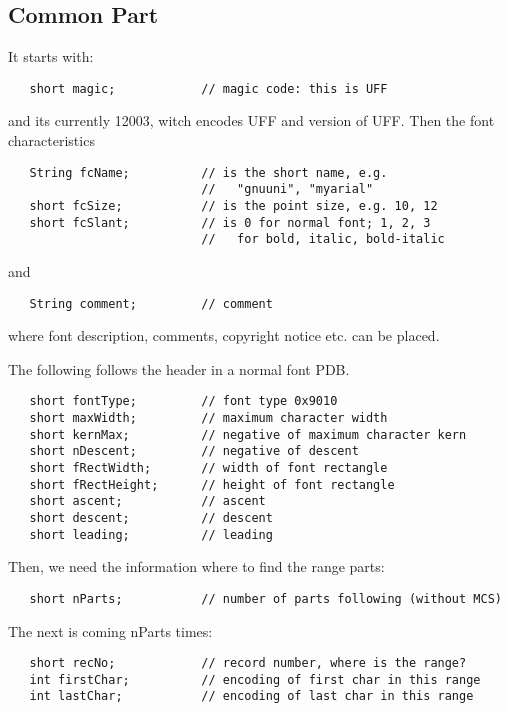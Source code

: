 \documentclass[a4paper]{article}
\begin{document}
\subsection{Common Part}

It starts with:

\begin{verbatim}
   short magic;            // magic code: this is UFF
\end{verbatim}

and its currently 12003, witch encodes UFF and version of UFF. Then
the font characteristics 

\begin{verbatim}
   String fcName;          // is the short name, e.g. 
                           //   "gnuuni", "myarial"
   short fcSize;           // is the point size, e.g. 10, 12
   short fcSlant;          // is 0 for normal font; 1, 2, 3 
                           //   for bold, italic, bold-italic
\end{verbatim}

and

\begin{verbatim}
   String comment;         // comment
\end{verbatim}

where font description, comments, copyright notice etc. can be placed.

The following follows the header in a normal font PDB.

\begin{verbatim}
   short fontType;         // font type 0x9010
   short maxWidth;         // maximum character width
   short kernMax;          // negative of maximum character kern
   short nDescent;         // negative of descent
   short fRectWidth;       // width of font rectangle
   short fRectHeight;      // height of font rectangle
   short ascent;           // ascent
   short descent;          // descent
   short leading;          // leading
\end{verbatim}



Then, we need the information where to find the range parts:

\begin{verbatim}
   short nParts;           // number of parts following (without MCS)
\end{verbatim}

The next is coming nParts times:

\begin{verbatim}
   short recNo;            // record number, where is the range?
   int firstChar;          // encoding of first char in this range
   int lastChar;           // encoding of last char in this range
\end{verbatim}
\end{document}
